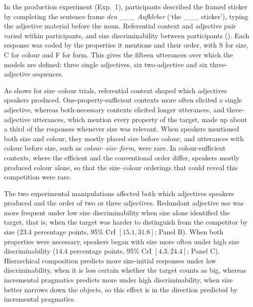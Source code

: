 \documentclass[10pt,a4paper,fleqn]{article}
\newcommand{\adj}[1]{\textsc{#1}}
\begin{document}
In the production experiment (Exp.~1), participants described the framed sticker by completing the sentence frame \emph{den \_\_\_ Aufkleber} (`the \_\_\_ sticker'), typing the adjective material before the noun.
Referential context and adjective pair varied within participants, and size discriminability between participants ().
Each response was coded by the properties it mentions and their order, with \adj{S} for size, \adj{C} for colour and \adj{F} for form.
This gives the fifteen utterances over which the models are defined: three single adjectives, six two-adjective and six three-adjective sequences.

As  shows for size--colour trials, referential context shaped which adjectives speakers produced.
One-property-sufficient contexts more often elicited a single adjective, whereas both-necessary contexts elicited longer utterances, and three-adjective utterances, which mention every property of the target, made up about a third of the responses whenever size was relevant.
When speakers mentioned both size and colour, they mostly placed size before colour, and utterances with colour before size, such as \emph{colour--size--form}, were rare.
In colour-sufficient contexts, where the efficient and the conventional order differ, speakers mostly produced colour alone, so that the size--colour orderings that could reveal this competition were rare.

The two experimental manipulations affected both which adjectives speakers produced and the order of two or three adjectives.
Redundant adjective use was more frequent under low size discriminability when size alone identified the target, that is, when the target was harder to distinguish from the competitor by size ($23.4$ percentage points, 95\% CrI $[15.1,31.8]$; Panel B).
When both properties were necessary, speakers began with size more often under high size discriminability ($14.4$ percentage points, 95\% CrI $[4.3,24.4]$; Panel C).
Hierarchical composition predicts more size-initial responses under low discriminability, when it is less certain whether the target counts as big, whereas incremental pragmatics predicts more under high discriminability, when size better narrows down the objects, so this effect is in the direction predicted by incremental pragmatics.
\end{document}
